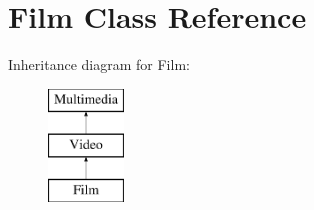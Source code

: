 \hypertarget{class_film}{\section{Film Class Reference}
\label{class_film}
}
Inheritance diagram for Film\-:\begin{figure}[H]
\begin{center}
\leavevmode
\includegraphics[height=3.000000cm]{class_film}
\end{center}
\end{figure}
